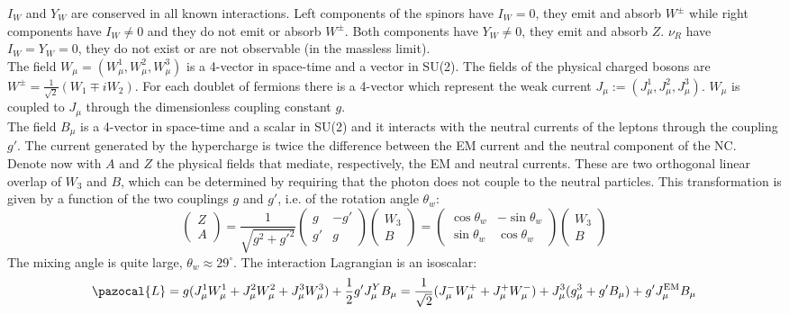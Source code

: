\documentclass[10.75pt,a4paper,openright,bottom=2cm]{article}
\begin{document}
$I_W$ and $Y_W$ are conserved in all known interactions. Left components of the spinors have $I_W=0$, they emit and absorb $W^\pm$ while right components have $I_W\neq0$ and they do not emit or absorb $W^\pm$. Both components have $Y_W\neq0$, they emit and absorb $Z$. $\nu_R$ have $I_W=Y_W=0$, they do not exist or are not observable (in the massless limit).\\
The field $W_\mu=(W_\mu^1,W_\mu^2,W_\mu^3)$ is a 4-vector in space-time and a vector in SU(2). The fields of the physical charged bosons are $W^\pm=\frac{1}{\sqrt{2}}(W_1\mp iW_2)$. For each doublet of fermions there is a 4-vector which represent the weak current $J_\mu:=(J_\mu^1,J_\mu^2,J_\mu^3)$. $W_\mu$ is coupled to $J_\mu$ through the dimensionless coupling constant $g$.\\
The field $B_\mu$ is a 4-vector in space-time and a scalar in SU(2) and it interacts with the neutral currents of the leptons through the coupling $g'$. The current generated by the hypercharge is twice the difference between the EM current and the neutral component of the NC.\\
Denote now with $A$ and $Z$ the physical fields that mediate, respectively, the EM and neutral currents. These are two orthogonal linear overlap of $W_3$ and $B$, which can be determined by requiring that the photon does not couple to the neutral particles. This transformation is given by a function of the two couplings $g$ and $g'$, i.e. of the rotation angle $\theta_w$:
\[
\begin{pmatrix}
    Z\\A
\end{pmatrix}=\frac{1}{\sqrt{g^2+g'^2}}\begin{pmatrix}
    g & -g'\\g' & g
\end{pmatrix}
\begin{pmatrix}
    W_3\\B
\end{pmatrix}=\begin{pmatrix}
    \cos\theta_w & -\sin\theta_w\\ \sin\theta_w & \cos\theta_w
\end{pmatrix}
\begin{pmatrix}
    W_3\\B
\end{pmatrix}
\]
The mixing angle is quite large, $\theta_w\approx29^\circ$. The interaction Lagrangian is an isoscalar:
\[
\pazocal{L}=g(J_\mu^1W_\mu^1+J_\mu^2W_\mu^2+J_\mu^3W_\mu^3)+\frac{1}{2}g'J_\mu^YB_\mu=\frac{1}{\sqrt{2}}(J_\mu^-W_\mu^++J_\mu^+W_\mu^-)+J_\mu^3(g_\mu^3+g'B_\mu)+g'J_\mu^{\text{EM}}B_\mu
\]
\end{document}

